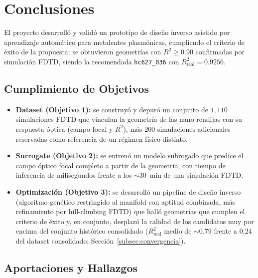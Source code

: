 \section{Conclusiones}\label{sec:conclusiones}

El proyecto desarrolló y validó un prototipo de diseño inverso asistido por aprendizaje automático para metalentes plasmónicas, cumpliendo el criterio de éxito de la propuesta: se obtuvieron geometrías con $R^2 \geq 0.90$ confirmadas por simulación FDTD, siendo la recomendada \texttt{hc627\_036} con $R^2_{\text{real}} = 0.9256$.

\subsection{Cumplimiento de Objetivos}\label{subsec:cumplimiento}

\begin{itemize}
    \item \textbf{Dataset (Objetivo 1):} se construyó y depuró un conjunto de $1{,}110$ simulaciones FDTD que vinculan la geometría de las nano-rendijas con su respuesta óptica (campo focal y $R^2$), más $200$ simulaciones adicionales reservadas como referencia de un régimen físico distinto.
    \item \textbf{Surrogate (Objetivo 2):} se entrenó un modelo subrogado que predice el campo óptico focal completo a partir de la geometría, con tiempo de inferencia de milisegundos frente a los ${\sim}30$~min de una simulación FDTD.
    \item \textbf{Optimización (Objetivo 3):} se desarrolló un pipeline de diseño inverso (algoritmo genético restringido al manifold con aptitud combinada, más refinamiento por hill-climbing FDTD) que halló geometrías que cumplen el criterio de éxito y, en conjunto, desplazó la calidad de los candidatos muy por encima del conjunto histórico consolidado ($R^2_{\text{real}}$ medio de ${\sim}0.79$ frente a $0.24$ del dataset consolidado; Sección~\ref{subsec:convergencia}).
\end{itemize}

\subsection{Aportaciones y Hallazgos}\label{subsec:hallazgos}

